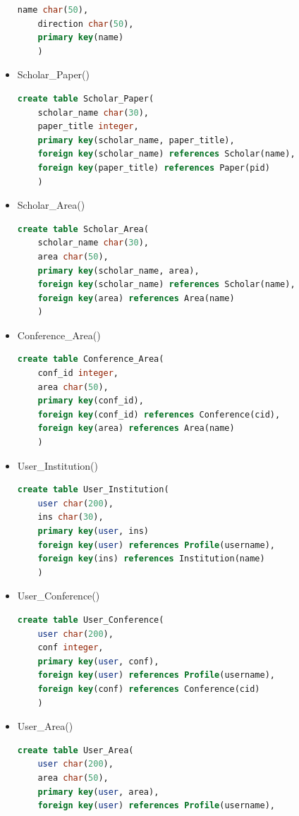 \begin{itemize}
\begin{lstlisting}[language=SQL]
	name char(50),
	direction char(50),
	primary key(name)
	)
\end{lstlisting}
\item {\myfont Scholar\_Paper()}
\begin{lstlisting}[language=SQL]  
create table Scholar_Paper(
	scholar_name char(30),
	paper_title integer,
	primary key(scholar_name, paper_title),
	foreign key(scholar_name) references Scholar(name),
	foreign key(paper_title) references Paper(pid)
	)
\end{lstlisting}
\item {\myfont Scholar\_Area()}
\begin{lstlisting}[language=SQL]  
create table Scholar_Area(
	scholar_name char(30),
	area char(50),
	primary key(scholar_name, area),
	foreign key(scholar_name) references Scholar(name),
	foreign key(area) references Area(name)
	)
\end{lstlisting}
\item {\myfont Conference\_Area()}
\begin{lstlisting}[language=SQL]  
create table Conference_Area(
	conf_id integer,
	area char(50),
	primary key(conf_id),
	foreign key(conf_id) references Conference(cid),
	foreign key(area) references Area(name)
	)
\end{lstlisting}
\item {\myfont User\_Institution()}
\begin{lstlisting}[language=SQL] 
create table User_Institution(
	user char(200),
	ins char(30),
	primary key(user, ins)
	foreign key(user) references Profile(username),
	foreign key(ins) references Institution(name)
	)
\end{lstlisting}
\item {\myfont User\_Conference()}
\begin{lstlisting}[language=SQL]  
create table User_Conference(
	user char(200),
	conf integer,
	primary key(user, conf),
	foreign key(user) references Profile(username),
	foreign key(conf) references Conference(cid)
	)
\end{lstlisting}
\item {\myfont User\_Area()}
\begin{lstlisting}[language=SQL]  
create table User_Area(
	user char(200),
	area char(50),
	primary key(user, area),
	foreign key(user) references Profile(username),

\end{lstlisting}
\end{itemize}
